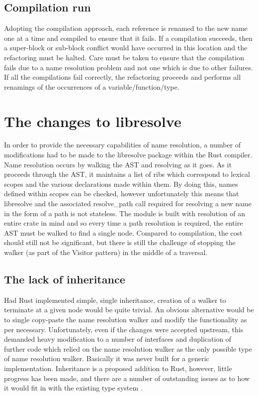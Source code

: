 \subsection{Compilation run}
Adopting the compilation approach, each reference is renamed to the new name one at a time and compiled to ensure that it fails. If a compilation succeeds, then a super-block or sub-block conflict would have occurred in this location and the refactoring must be halted. Care must be taken to ensure that the compilation fails due to a name resolution problem and not one which is due to other failures. If all the compilations fail correctly, the refactoring proceeds and performs all renamings of the occurrences of a variable/function/type.

\section{The changes to libresolve}\label{S:changes}
In order to provide the necessary capabilities of name resolution, a number of modifications had to be made to the libresolve package within the Rust compiler. Name resolution occurs by walking the AST and resolving as it goes. As it proceeds through the AST, it maintains a list of ribs which correspond to lexical scopes and the various declarations made within them. By doing this, names defined within scopes can be checked, however unfortunately this means that libresolve and the associated resolve\_path call required for resolving a new name in the form of a path is not stateless. The module is built with resolution of an entire crate in mind and so every time a path resolution is required, the entire AST must be walked to find a single node. Compared to compilation, the cost should still not be significant, but there is still the challenge of stopping the walker (as part of the Visitor pattern) in the middle of a traversal. 

\subsection{The lack of inheritance}
Had Rust implemented simple, single inheritance, creation of a walker to terminate at a given node would be quite trivial. An obvious alternative would be to single copy-paste the name resolution walker and modify the functionality as per necessary. Unfortunately, even if the changes were accepted upstream, this demanded heavy modification to a number of interfaces and duplication of further code which relied on the name resolution walker as the only possible type of name resolution walker. Basically it was never built for a generic implementation. Inheritance is a proposed addition to Rust, however, little progress has been made, and there are a number of outstanding issues as to how it would fit in with the existing type system \cite{inherit}.

